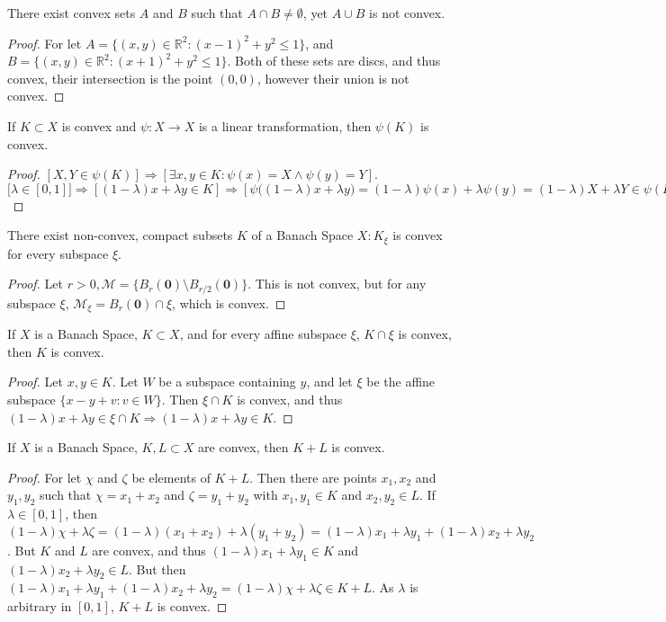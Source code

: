 \documentclass[crop=false,class=book]{standalone}
\begin{document}
\begin{theorem}
There exist convex sets $A$ and $B$ such that $A\cap B \ne \emptyset$, yet $A\cup B$ is not convex.
\end{theorem}
\begin{proof}
For let $A = \{(x,y)\in \mathbb{R}^2: (x-1)^2+y^2\leq 1\}$, and $B = \{(x,y)\in \mathbb{R}^2:(x+1)^2+y^2\leq 1\}$. Both of these sets are discs, and thus convex, their intersection is the point $(0,0)$, however their union is not convex.
\end{proof}
\begin{theorem}
If $K\subset X$ is convex and $\psi:X\rightarrow X$ is a linear transformation, then $\psi(K)$ is convex.
\end{theorem}
\begin{proof}
$[X,Y\in \psi(K)]\Rightarrow [\exists x,y\in K:\psi(x)=X\land \psi(y)=Y]$. $\big[\lambda \in [0,1]\big]\Rightarrow [(1-\lambda)x+\lambda y\in K]\Rightarrow [\psi\big((1-\lambda)x+\lambda y\big)=(1-\lambda)\psi(x)+\lambda\psi(y) = (1-\lambda)X+\lambda Y \in \psi(K)]$
\end{proof}
\begin{theorem}
There exist non-convex, compact subsets $K$ of a Banach Space $X: K_{\xi}$ is convex for every subspace $\xi$.
\end{theorem}
\begin{proof}
Let $r>0, \mathcal{M} = \{B_{r}(\mathbf{0})\setminus B_{r/2}(\mathbf{0})\}$. This is not convex, but for any subspace $\xi$, $\mathcal{M}_{\xi} = B_{r}(\mathbf{0})\cap \xi$, which is convex.
\end{proof}
\begin{theorem}
If $X$ is a Banach Space, $K\subset X$, and for every affine subspace $\xi$, $K\cap \xi$ is convex, then $K$ is convex.
\end{theorem}
\begin{proof}
Let $x,y\in K$. Let $W$ be a subspace containing $y$, and let $\xi$ be the affine subspace $\{x-y+v:v\in W\}$. Then $\xi\cap K$ is convex, and thus $(1-\lambda)x+\lambda y \in \xi \cap K \Rightarrow (1-\lambda)x+\lambda y \in K$.
\end{proof}
\begin{theorem}
If $X$ is a Banach Space, $K,L\subset X$ are convex, then $K+L$ is convex.
\end{theorem}
\begin{proof}
For let $\chi$ and $\zeta$ be elements of $K+L$. Then there are points $x_1,x_2$ and $y_1,y_2$ such that $\chi=x_1+x_2$ and $\zeta = y_1+y_2$ with $x_1,y_1\in K$ and $x_2,y_2\in L$. If $\lambda \in [0,1]$, then $(1-\lambda)\chi + \lambda \zeta = (1-\lambda)(x_1+x_2)+\lambda(y_1+y_2) = (1-\lambda)x_1 + \lambda y_1 + (1-\lambda)x_2 + \lambda y_2$. But $K$ and $L$ are convex, and thus $(1-\lambda)x_1 + \lambda y_1 \in K$ and $(1-\lambda)x_2 + \lambda y_2 \in L$. But then $(1-\lambda)x_1 + \lambda y_1 + (1-\lambda)x_2 + \lambda y_2=(1-\lambda)\chi + \lambda \zeta\in K+L$. As $\lambda$ is arbitrary in $[0,1]$, $K+L$ is convex.
\end{proof}
\end{document}
